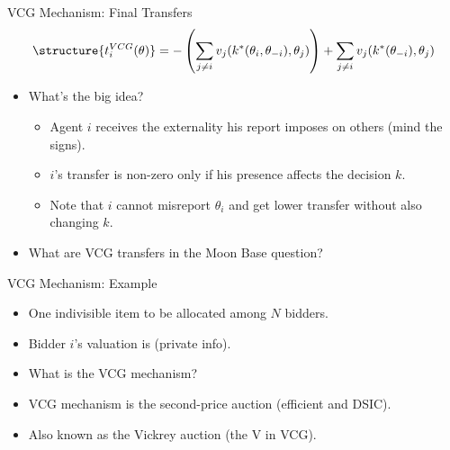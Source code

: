 \documentclass[english,10pt
,aspectratio=169
,handout
]{beamer}
\begin{document}
\begin{frame}{VCG Mechanism: Final Transfers}
\begin{align*}
\structure{ t_{i}^{VCG}(\theta) } = -\left(\sum_{j\neq i} v_{j}(k^*(\theta_i, \theta_{-i}), \theta_{j}) \right) + \sum_{j\neq i} v_{j}(k^*(\theta_{-i}), \theta_{j})
\end{align*}
\begin{itemize}
	\item What's the big idea?
	\begin{itemize}
		\item Agent $i$ receives the externality his report imposes on others (mind the signs).
		\item $i$'s transfer is non-zero only if his presence affects the decision $k$.
		\item Note that $i$ cannot misreport $\theta_i$ and get lower transfer without also changing $k$.
	\end{itemize}
	\item What are VCG transfers in the Moon Base question?
\end{itemize}
\end{frame}

\begin{frame}{VCG Mechanism: Example}
\begin{example}[Auction]
	\begin{itemize}
		\item One indivisible item to be allocated among $N$ bidders.
		\item Bidder $i$'s valuation is  (private info).
		\item What is the VCG mechanism?
	\end{itemize}
\end{example}
\begin{itemize}
	\item VCG mechanism is the second-price auction (efficient and DSIC).
	\item Also known as the Vickrey auction (the V in VCG).
\end{itemize}
\end{frame}
\end{document}
